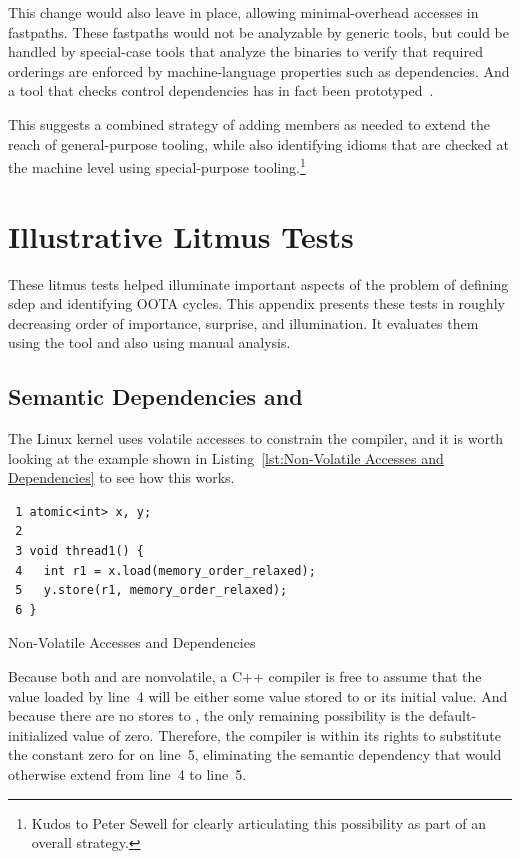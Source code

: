 \documentclass[10]{article}
\begin{document}
This change would also leave  in place,
allowing minimal-overhead accesses in fastpaths.
These fastpaths would not be analyzable by generic tools, but could
be handled by special-case tools that analyze the binaries to verify
that required orderings are enforced by machine-language properties
such as dependencies.
And a tool that checks control dependencies has in fact been
prototyped~\cite{PaulHeidekrueger2022N4910}.

This suggests a combined strategy of adding  members
as needed to extend the reach of general-purpose tooling, while also
identifying  idioms that are checked at the
machine level using special-purpose tooling.\footnote{
	Kudos to Peter Sewell for clearly articulating this possibility
	as part of an overall strategy.}

\clearpage

\section{Illustrative Litmus Tests}
\label{app:Illustrative Litmus Tests}

These litmus tests helped illuminate important aspects of the problem
of defining sdep and identifying OOTA cycles.
This appendix presents these tests in roughly decreasing order of
importance, surprise, and illumination.
It evaluates them using the  tool and also using manual
analysis.

\subsection{Semantic Dependencies and }
\label{app:Semantic Dependencies and volatile}

The Linux kernel uses volatile accesses to constrain the compiler,
and it is worth looking at the example shown in
Listing~\ref{lst:Non-Volatile Accesses and Dependencies}
to see how this works.

\begin{listing}
\begin{verbatim}
 1 atomic<int> x, y;
 2
 3 void thread1() {
 4   int r1 = x.load(memory_order_relaxed);
 5   y.store(r1, memory_order_relaxed);
 6 }
\end{verbatim}
\caption{Non-Volatile Accesses and Dependencies}
\label{lst:Non-Volatile Accesses and Dependencies}
\end{listing}

Because both  and  are nonvolatile, a C++ compiler is
free to assume that the value loaded by line~4 will be either some value
stored to  or its initial value.
And because there are no stores to , the only remaining possibility
is the default-initialized value of zero.
Therefore, the compiler is within its rights to substitute
the constant zero for  on line~5, eliminating the semantic
dependency that would otherwise extend from line~4 to line~5.
\end{document}
